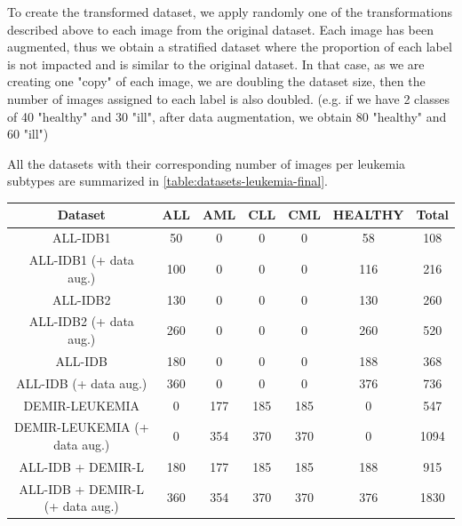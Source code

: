 \documentclass[11pt, openany]{report}
\theoremstyle{plain}
\theoremstyle{definition}
\theoremstyle{remark}
\begin{document}
\newpage

To create the transformed dataset, we apply randomly one of the transformations described above to each image from the original dataset. Each image has been augmented, thus we obtain a stratified dataset where the proportion of each label is not impacted and is similar to the original dataset. In that case, as we are creating one "copy" of each image, we are doubling the dataset size, then the number of images assigned to each label is also doubled. (e.g. if we have 2 classes of 40 "healthy" and 30 "ill", after data augmentation, we obtain 80 "healthy" and 60 "ill")

All the datasets with their corresponding number of images per leukemia subtypes are summarized in \autoref{table:datasets-leukemia-final}. 

\begin{center}
    \begin{tabular}{|c|c|c|c|c|c|c|}
      \hline
      \textbf{Dataset} & \textbf{ALL} & \textbf{AML} & \textbf{CLL} & \textbf{CML} & \textbf{HEALTHY} & \textbf{Total}\\
      \hline
      ALL-IDB1 & 50 & 0 & 0 & 0 & 58 & 108  \\
      \hline
      ALL-IDB1 (+ data aug.) & 100 & 0 & 0 & 0 & 116 & 216  \\
      \hline
      ALL-IDB2 & 130 & 0 & 0 & 0 & 130 & 260  \\
      \hline
      ALL-IDB2 (+ data aug.) & 260 & 0 & 0 & 0 & 260 & 520  \\
      \hline
      ALL-IDB & 180 & 0 & 0 & 0 & 188 & 368  \\
      \hline
      ALL-IDB (+ data aug.) & 360 & 0 & 0 & 0 & 376 & 736  \\
      \hline
      DEMIR-LEUKEMIA & 0 & 177 & 185 & 185 & 0 & 547  \\
      \hline
      DEMIR-LEUKEMIA (+ data aug.) & 0 & 354 & 370 & 370 & 0 & 1094  \\
      \hline
      \hline
      ALL-IDB + DEMIR-L & 180 & 177 & 185 & 185 & 188 & 915 \\ 
      \hline
      ALL-IDB + DEMIR-L (+ data aug.) & 360 & 354 & 370 & 370 & 376 & 1830 \\ 
      \hline
    \end{tabular}
    \label{table:datasets-leukemia-final}
\end{center} 
\end{document}
